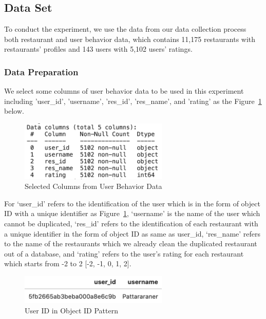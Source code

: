 \documentclass[12pt,oneside,openright,a4paper]{cpe-english-project}
\begin{document}
\subsection{Data Set} \label{sec:dataset}

To conduct the experiment, we use the data from our data collection process both restaurant and user behavior data, which contains 11,175 restaurants with restaurants’ profiles and 143 users with 5,102 users’ ratings.

\subsubsection{Data Preparation}

We select some columns of user behavior data to be used in this experiment including 'user\_id', 'username', 'res\_id', 'res\_name', and 'rating' as the Figure~\ref{fig:4SelectedColumnsfromUserBehaviorData} below.

\begin{figure}[H]\centering
\includegraphics[width=200pt]{./images/4SelectedColumnsfromUserBehaviorData.png}
\caption{Selected Columns from User Behavior Data}\label{fig:4SelectedColumnsfromUserBehaviorData}
\end{figure}\vspace{-24pt}

For ‘user\_id’ refers to the identification of the user which is in the form of object ID with a unique identifier as Figure~\ref{fig:4SelectedColumnsfromUserBehaviorData}, ‘username’ is the name of the user which cannot be duplicated, ‘res\_id’ refers to the identification of each restaurant with a unique identifier in the form of object ID as same as user\_id, ‘res\_name’ refers to the name of the restaurants which we already clean the duplicated restaurant out of a database, and ‘rating’ refers to the user’s rating for each restaurant which starts from -2 to 2 [-2, -1, 0, 1, 2].

\begin{figure}[H]\centering
\includegraphics[width=200pt]{./images/4UserIDinObjectIDPattern.png}
\caption{User ID in Object ID Pattern}\label{fig:4UserIDinObjectIDPattern}
\end{figure}\vspace{-24pt}
\end{document}
